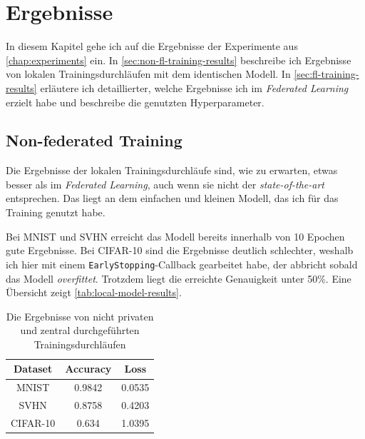 \chapter{Ergebnisse}\label{chap:results}

In diesem Kapitel gehe ich auf die Ergebnisse der Experimente aus \autoref{chap:experiments} ein. In \autoref{sec:non-fl-training-results} beschreibe ich Ergebnisse von lokalen Trainingsdurchläufen mit dem identischen Modell. In \autoref{sec:fl-training-results} erläutere ich detaillierter, welche Ergebnisse ich im \textit{Federated Learning} erzielt habe und beschreibe die genutzten Hyperparameter.

\section{Non-federated Training} \label{sec:non-fl-training-results}
Die Ergebnisse der lokalen Trainingsdurchläufe sind, wie zu erwarten, etwas besser als im \textit{Federated Learning}, auch wenn sie nicht der \textit{state-of-the-art} entsprechen. Das liegt an dem einfachen und kleinen Modell, das ich für das Training genutzt habe.

Bei MNIST und SVHN erreicht das Modell bereits innerhalb von 10 Epochen gute Ergebnisse. Bei CIFAR-10 sind die Ergebnisse deutlich schlechter, weshalb ich hier mit einem \texttt{EarlyStopping}-Callback gearbeitet habe, der abbricht sobald das Modell \textit{overfittet}. Trotzdem liegt die erreichte Genauigkeit unter 50\%. Eine Übersicht zeigt \autoref{tab:local-model-results}.

\begin{table}
	\centering
	\caption{Die Ergebnisse von nicht privaten und zentral durchgeführten Trainingsdurchläufen}
	\begin{tabular}{ccc}
		\toprule
		Dataset & Accuracy & Loss \\
		\midrule
		MNIST & 0.9842 & 0.0535 \\
		SVHN & 0.8758 & 0.4203 \\
		CIFAR-10 & 0.634 & 1.0395 \\
		\bottomrule
	\end{tabular}
	\label{tab:local-model-results}
\end{table}

